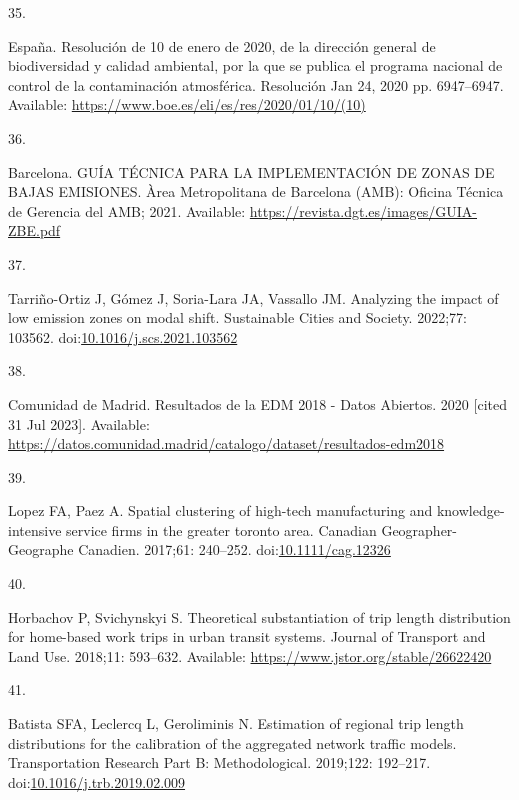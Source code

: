 \documentclass[10pt,letterpaper]{article}
\newlength{\cslhangindent}
\newlength{\csllabelwidth}
\newlength{\cslentryspacingunit} %
\newenvironment{CSLReferences}[2] %
 {%
  \setlength{\parindent}{0pt}
  \ifodd #1
  \let\oldpar\par
  \def\par{\hangindent=\cslhangindent\oldpar}
  \fi
  \setlength{\parskip}{#2\cslentryspacingunit}
 }%
 {}
\newcommand{\CSLLeftMargin}[1]{\parbox[t]{\csllabelwidth}{#1}}
\newcommand{\CSLRightInline}[1]{\parbox[t]{\linewidth - \csllabelwidth}{#1}\break}
\begin{document}
\begin{CSLReferences}{0}{0}
\leavevmode{}%
\CSLLeftMargin{35. }%
\CSLRightInline{España. Resolución de 10 de enero de 2020, de la
dirección general de biodiversidad y calidad ambiental, por la que se
publica el programa nacional de control de la contaminación atmosférica.
Resolución Jan 24, 2020 pp. 6947--6947. Available:
\url{https://www.boe.es/eli/es/res/2020/01/10/(10)}}

\leavevmode{}%
\CSLLeftMargin{36. }%
\CSLRightInline{Barcelona. {GUÍA} {TÉCNICA} {PARA} {LA} {IMPLEMENTACIÓN}
{DE} {ZONAS} {DE} {BAJAS} {EMISIONES}. Àrea Metropolitana de Barcelona
({AMB}): Oficina Técnica de Gerencia del {AMB}; 2021. Available:
\url{https://revista.dgt.es/images/GUIA-ZBE.pdf}}

\leavevmode{}%
\CSLLeftMargin{37. }%
\CSLRightInline{Tarriño-Ortiz J, Gómez J, Soria-Lara JA, Vassallo JM.
Analyzing the impact of low emission zones on modal shift. Sustainable
Cities and Society. 2022;77: 103562.
doi:\href{https://doi.org/10.1016/j.scs.2021.103562}{10.1016/j.scs.2021.103562}}

\leavevmode{}%
\CSLLeftMargin{38. }%
\CSLRightInline{Comunidad de Madrid. Resultados de la {EDM} 2018 - Datos
Abiertos. 2020 {[}cited 31 Jul 2023{]}. Available:
\url{https://datos.comunidad.madrid/catalogo/dataset/resultados-edm2018}}

\leavevmode{}%
\CSLLeftMargin{39. }%
\CSLRightInline{Lopez FA, Paez A. Spatial clustering of high-tech
manufacturing and knowledge-intensive service firms in the greater
toronto area. Canadian Geographer-Geographe Canadien. 2017;61: 240--252.
doi:\href{https://doi.org/10.1111/cag.12326}{10.1111/cag.12326}}

\leavevmode{}%
\CSLLeftMargin{40. }%
\CSLRightInline{Horbachov P, Svichynskyi S. Theoretical substantiation
of trip length distribution for home-based work trips in urban transit
systems. Journal of Transport and Land Use. 2018;11: 593--632.
Available: \url{https://www.jstor.org/stable/26622420}}

\leavevmode{}%
\CSLLeftMargin{41. }%
\CSLRightInline{Batista SFA, Leclercq L, Geroliminis N. Estimation of
regional trip length distributions for the calibration of the aggregated
network traffic models. Transportation Research Part B: Methodological.
2019;122: 192--217.
doi:\href{https://doi.org/10.1016/j.trb.2019.02.009}{10.1016/j.trb.2019.02.009}}


\end{CSLReferences}
\end{document}
